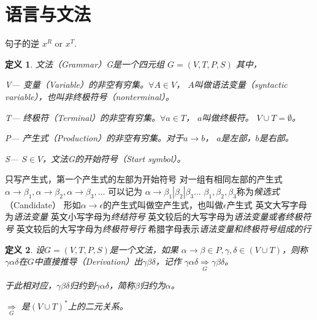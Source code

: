\documentclass[twocolumn,zihao=5,linespread=1,heading=false,autoindent=0pt]{ctexart}
\theoremstyle{exampstyle} \newtheorem{definition}{定义}[section]
\theoremstyle{exampstyle} \newtheorem{example}{例}[section]
\theoremstyle{exampstyle} \newtheorem{theorem}{定理}[section]
\theoremstyle{exampstyle} \newtheorem{lemma}{引理}[section]
\theoremstyle{exampstyle} \newtheorem{myproof}{证明}[section]
\begin{document}
\section{语言与文法}
\footnotesize

句子的逆 $x^R$ or $x^T$.

\begin{definition}
    文法（Grammar）G是一个四元组
    $
        G = (V, T, P, S)
    $
    其中，

    V--- \emph{变量（Variable）}的非空有穷集。$\forall A \in V$，
    $A$叫做语法变量（syntactic variable），也叫非终极符号（nonterminal）。
    
    T--- \emph{终极符（Terminal）}的非空有穷集。$\forall a \in T$，
    $a$叫做终极符。 $V \cup T = \emptyset$。

    P--- \emph{产生式（Production）}的非空有穷集。对于$a \to b$，
    $a$是\emph{左部}，$b$是\emph{右部}。

    S--- $S \in V$，文法G的\emph{开始符号（Start symbol）}。
\end{definition}

\begin{outline}[citemize]
    \1 只写产生式，第一个产生式的左部为开始符号
    \1 对一组有相同左部的产生式 \\
        $\alpha \to \beta_1, \alpha \to \beta_2, \alpha \to \beta_3, \dots$
        可以记为 $\alpha \to \beta_1 | \beta_2 | \beta_3 \dots$
        $\beta_1 , \beta_2 , \beta_3$称为\emph{候选式}（Candidate）
    \1 形如$\alpha \to \epsilon$的产生式叫做空产生式，也叫做$\epsilon$产生式
        \2 英文大写字母为\emph{语法变量}
        \2 英文小写字母为\emph{终结符号}
        \2 英文较后的大写字母为\emph{语法变量或者终极符号}
        \2 英文较后的大写字母为\emph{终极符号行}
        \2 希腊字母表示\emph{语法变量和终极符号组成的行}
\end{outline}

\begin{definition}
    设$G = (V,T,P,S)$是一个文法，如果
    $\alpha \to \beta\in P, \gamma,\delta  \in (V \cup T)$，则称
    $\gamma\alpha\delta$在$G$中\emph{直接推导}（Derivation）出$\gamma\beta\delta$，记作
    $\gamma\alpha\delta \underset{G} \Rightarrow \gamma\beta\delta$。

    于此相对应，$\gamma\beta\delta$归约到$\gamma\alpha\delta$，简称$\beta$归约为$\alpha$。

    $\underset{G} \Rightarrow$ 是$\left( V \cup T \right)^*$上的二元关系。
\end{definition}
\end{document}
